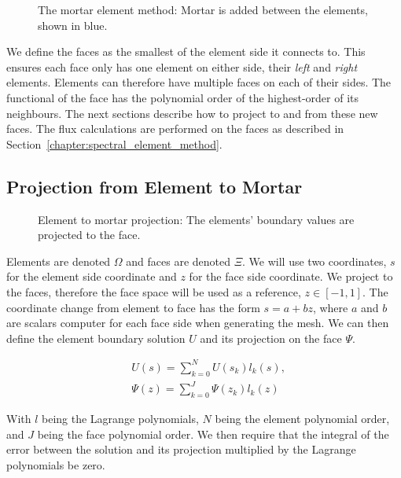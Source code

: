 \begin{figure}[H]
	\centering
	
	\caption{The mortar element method: Mortar is added between the elements, shown in blue.}
	\label{fig:mortar_element_method}
\end{figure}

We define the faces as the smallest of the element side it connects to. This ensures each face only
has one element on either side, their \textit{left} and \textit{right} elements. Elements can
therefore have multiple faces on each of their sides. The functional of the face has the polynomial
order of the highest-order of its neighbours. The next sections describe how to project to and from
these new faces. The flux calculations are performed on the faces as described in
Section~\ref{chapter:spectral_element_method}. 

\subsection{Projection from Element to Mortar} \label{subsection:adaptive_mesh_refinement:mortar_element_method:element_to_mortar}

\begin{figure}[H]
	\centering
	
	\caption{Element to mortar projection: The elements' boundary values are projected to the face.}
	\label{fig:element_to_mortar}
\end{figure}

Elements are denoted $\Omega$ and faces are denoted $\Xi$. We will use two coordinates, $s$ for the
element side coordinate and $z$ for the face side coordinate. We project to the faces, therefore the
face space will be used as a reference, $z \in [-1, 1]$. The coordinate change from element to face
has the form $s = a + bz$, where $a$ and $b$ are scalars computer for each face side when generating
the mesh. We can then define the element boundary solution $U$ and its projection on the face
$\Psi$. 

\begin{align} 
	& U(s) = \sum_{k = 0}^{N} U(s_k) l_k(s), \label{equ:element_boundary_solution} \\
	& \Psi (z) = \sum_{k = 0}^{J} \Psi(z_k) l_k(z) \label{equ:face_projected_solution}
\end{align}

With $l$ being the Lagrange polynomials, $N$ being the element polynomial order, and $J$ being the
face polynomial order. We then require that the integral of the error between the solution and its
projection multiplied by the Lagrange polynomials be zero. 

